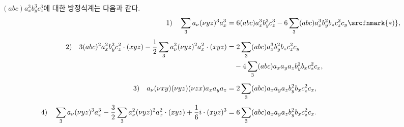 
$(abc)a_x^3b_y^3c_z^3$에 대한 방정식계는 다음과 같다.
\begingroup\small
\[
\begin{aligned}
1)\quad
\sum_3a_\nu(\nu yz)^3a_x^3
&=6(abc)a_x^3b_y^3c_z^3-6\sum_3(abc)a_x^3b_y^2b_zc_z^2c_y\srcfnmark{*)},\\[0.4em]
2)\quad
3(abc)^2a_x^2b_y^2c_z^2\cdot(xyz)-\frac12\sum_3a_\nu^2(\nu yz)^2a_x^2\cdot(xyz)
&=2\sum_3(abc)a_x^3b_y^2b_zc_z^2c_y\\
&\quad-4\sum_3(abc)a_xa_ya_zb_y^2b_xc_z^2c_x,\\[0.4em]
3)\quad
a_\nu(\nu xy)(\nu yz)(\nu zx)a_xa_ya_z
&=2\sum_3(abc)a_xa_ya_zb_y^2b_xc_z^2c_x,\\[0.4em]
4)\quad
\sum_3a_\nu(\nu yz)^3a_x^3-\frac32\sum_3a_\nu^2(\nu yz)^2a_x^2\cdot(xyz)+\frac16i\cdot(xyz)^3
&=6\sum_3(abc)a_xa_ya_zb_y^2b_xc_z^2c_x.
\end{aligned}
\]
\endgroup
{}
